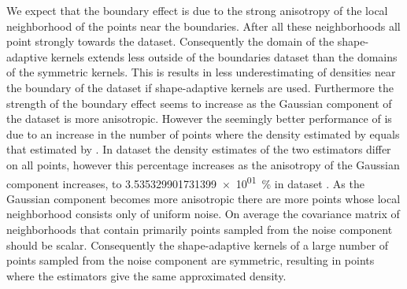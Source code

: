 		We expect that the boundary effect is due to the strong anisotropy of the local neighborhood of the points near the boundaries. After all these neighborhoods all point strongly towards the dataset. Consequently the domain of the shape-adaptive kernels extends less outside of the boundaries dataset than the domains of the symmetric kernels. This is results in less underestimating of densities near the boundary of the dataset if shape-adaptive kernels are used.
		Furthermore the strength of the boundary effect seems to increase as the Gaussian component of the dataset is more anisotropic. However the seemingly better performance of \sambe is due to an increase in the number of points where the density estimated by \sambe equals that estimated by \mbe. In dataset \ferdosiOne the density estimates of the two estimators differ on all points, however this percentage increases as the anisotropy of the Gaussian component increases, to \SI{3.535329901731399e+01}{\percent} in dataset \baakmanFive. 
		As the Gaussian component becomes more anisotropic there are more points whose local neighborhood consists only of uniform noise. On average the covariance matrix of neighborhoods that contain primarily points sampled from the noise component should be scalar. Consequently the shape-adaptive kernels of a large number of points sampled from the noise component are symmetric, resulting in points where the estimators give the same approximated density.
	
